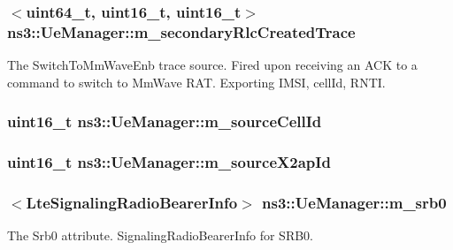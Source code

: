 \subsubsection[{\texorpdfstring{m\+\_\+secondary\+Rlc\+Created\+Trace}{m_secondaryRlcCreatedTrace}}]{$<$uint64\+\_\+t, uint16\+\_\+t, uint16\+\_\+t$>$ ns3\+::\+Ue\+Manager\+::m\+\_\+secondary\+Rlc\+Created\+Trace\hspace{0.3cm}{\ttfamily [private]}}\hypertarget{classns3_1_1UeManager_a1fd26ae2275ed93d13fefd27d1b89307}{}\label{classns3_1_1UeManager_a1fd26ae2275ed93d13fefd27d1b89307}
The {\ttfamily Switch\+To\+Mm\+Wave\+Enb} trace source. Fired upon receiving an A\+CK to a command to switch to Mm\+Wave R\+AT. Exporting I\+M\+SI, cell\+Id, R\+N\+TI. 
\subsubsection[{\texorpdfstring{m\+\_\+source\+Cell\+Id}{m_sourceCellId}}]{\setlength{\rightskip}{0pt plus 5cm}uint16\+\_\+t ns3\+::\+Ue\+Manager\+::m\+\_\+source\+Cell\+Id\hspace{0.3cm}{\ttfamily [private]}}\hypertarget{classns3_1_1UeManager_add9ed1d405182617c513205fab32d470}{}\label{classns3_1_1UeManager_add9ed1d405182617c513205fab32d470}
\subsubsection[{\texorpdfstring{m\+\_\+source\+X2ap\+Id}{m_sourceX2apId}}]{\setlength{\rightskip}{0pt plus 5cm}uint16\+\_\+t ns3\+::\+Ue\+Manager\+::m\+\_\+source\+X2ap\+Id\hspace{0.3cm}{\ttfamily [private]}}\hypertarget{classns3_1_1UeManager_aec435692a673cd55353a2bb258d5f487}{}\label{classns3_1_1UeManager_aec435692a673cd55353a2bb258d5f487}
\subsubsection[{\texorpdfstring{m\+\_\+srb0}{m_srb0}}]{$<${\bf Lte\+Signaling\+Radio\+Bearer\+Info}$>$ ns3\+::\+Ue\+Manager\+::m\+\_\+srb0\hspace{0.3cm}{\ttfamily [private]}}\hypertarget{classns3_1_1UeManager_a8125951721a3aeefbf6ea5af111f2f3f}{}\label{classns3_1_1UeManager_a8125951721a3aeefbf6ea5af111f2f3f}
The {\ttfamily Srb0} attribute. Signaling\+Radio\+Bearer\+Info for S\+R\+B0. 
